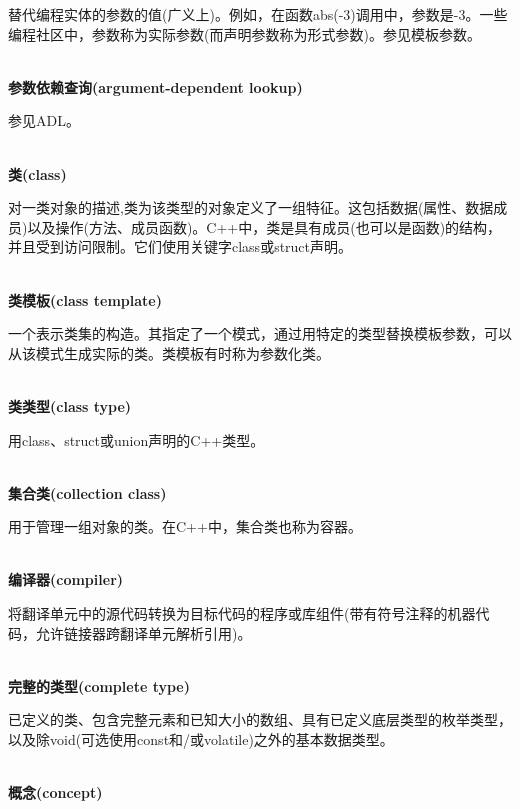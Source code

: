 替代编程实体的参数的值(广义上)。例如，在函数abs(-3)调用中，参数是-3。一些编程社区中，参数称为实际参数(而声明参数称为形式参数)。参见模板参数。

\hspace*{\fill} \\ %
\noindent
\textbf{参数依赖查询(argument-dependent lookup)}

参见ADL。

\hspace*{\fill} \\ %
\noindent
\textbf{类(class)}
 
对一类对象的描述,类为该类型的对象定义了一组特征。这包括数据(属性、数据成员)以及操作(方法、成员函数)。C++中，类是具有成员(也可以是函数)的结构，并且受到访问限制。它们使用关键字class或struct声明。

\hspace*{\fill} \\ %
\noindent
\textbf{类模板(class template)}

一个表示类集的构造。其指定了一个模式，通过用特定的类型替换模板参数，可以从该模式生成实际的类。类模板有时称为参数化类。

\hspace*{\fill} \\ %
\noindent
\textbf{类类型(class type)}

用class、struct或union声明的C++类型。

\hspace*{\fill} \\ %
\noindent
\textbf{集合类(collection class)}

用于管理一组对象的类。在C++中，集合类也称为容器。

\hspace*{\fill} \\ %
\noindent
\textbf{编译器(compiler)}

将翻译单元中的源代码转换为目标代码的程序或库组件(带有符号注释的机器代码，允许链接器跨翻译单元解析引用)。

\hspace*{\fill} \\ %
\noindent
\textbf{完整的类型(complete type)}

已定义的类、包含完整元素和已知大小的数组、具有已定义底层类型的枚举类型，以及除void(可选使用const和/或volatile)之外的基本数据类型。

\hspace*{\fill} \\ %
\noindent
\textbf{概念(concept)}

